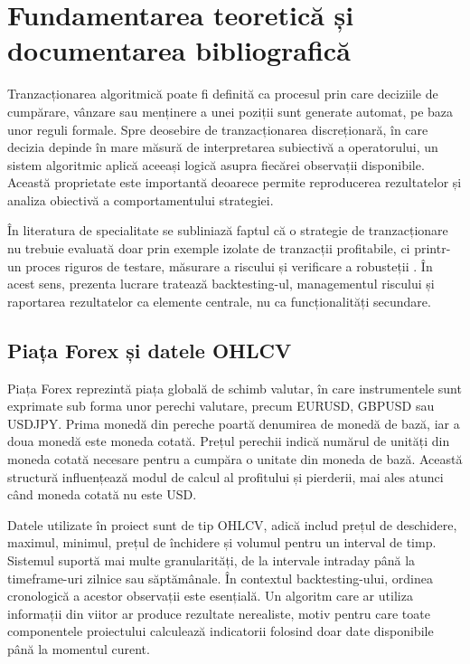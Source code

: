 \chapter{Fundamentarea teoretică și documentarea bibliografică}
\label{cap:cap2}

Tranzacționarea algoritmică poate fi definită ca procesul prin care deciziile de cumpărare, vânzare sau menținere a unei poziții sunt generate automat, pe baza unor reguli formale. Spre deosebire de tranzacționarea discreționară, în care decizia depinde în mare măsură de interpretarea subiectivă a operatorului, un sistem algoritmic aplică aceeași logică asupra fiecărei observații disponibile. Această proprietate este importantă deoarece permite reproducerea rezultatelor și analiza obiectivă a comportamentului strategiei.

În literatura de specialitate se subliniază faptul că o strategie de tranzacționare nu trebuie evaluată doar prin exemple izolate de tranzacții profitabile, ci printr-un proces riguros de testare, măsurare a riscului și verificare a robusteții \cite{book:chan:algo_trading}. În acest sens, prezenta lucrare tratează backtesting-ul, managementul riscului și raportarea rezultatelor ca elemente centrale, nu ca funcționalități secundare.

\section{Piața Forex și datele OHLCV}
\label{cap:cap2:forex}

Piața Forex reprezintă piața globală de schimb valutar, în care instrumentele sunt exprimate sub forma unor perechi valutare, precum EURUSD, GBPUSD sau USDJPY. Prima monedă din pereche poartă denumirea de monedă de bază, iar a doua monedă este moneda cotată. Prețul perechii indică numărul de unități din moneda cotată necesare pentru a cumpăra o unitate din moneda de bază. Această structură influențează modul de calcul al profitului și pierderii, mai ales atunci când moneda cotată nu este USD.

Datele utilizate în proiect sunt de tip OHLCV, adică includ prețul de deschidere, maximul, minimul, prețul de închidere și volumul pentru un interval de timp. Sistemul suportă mai multe granularități, de la intervale intraday până la timeframe-uri zilnice sau săptămânale. În contextul backtesting-ului, ordinea cronologică a acestor observații este esențială. Un algoritm care ar utiliza informații din viitor ar produce rezultate nerealiste, motiv pentru care toate componentele proiectului calculează indicatorii folosind doar date disponibile până la momentul curent.

